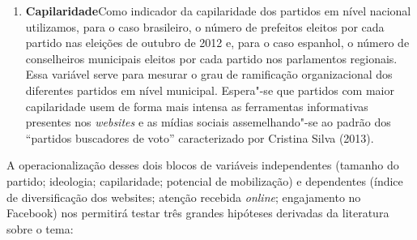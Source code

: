 \begin{enumerate}
\item\textbf{Capilaridade}\quad Como indicador da capilaridade dos partidos
em nível nacional utilizamos, para o caso brasileiro, o número de
prefeitos eleitos por cada partido nas eleições de outubro de 2012 e,
para o caso espanhol, o número de conselheiros municipais eleitos por
cada partido nos parlamentos regionais. Essa variável serve para mesurar
o grau de ramificação organizacional dos diferentes partidos em nível
municipal. Espera"-se que partidos com maior capilaridade usem de forma
mais intensa as ferramentas informativas presentes nos \textit{websites} e as
mídias sociais assemelhando"-se ao padrão dos ``partidos buscadores de
voto'' caracterizado por Cristina Silva (2013).
\end{enumerate}

A operacionalização desses dois blocos de variáveis independentes
(tamanho do partido; ideologia; capilaridade; potencial de mobilização)
e dependentes (índice de diversificação dos websites; atenção recebida
\textit{online}; engajamento no Facebook) nos permitirá testar três grandes
hipóteses derivadas da literatura sobre o tema:

